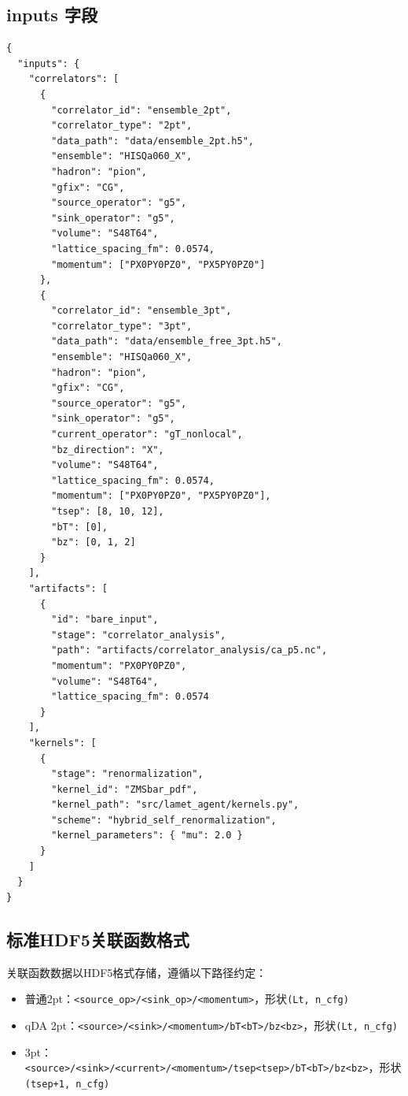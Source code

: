 \documentclass[12pt,a4paper]{ctexart}
\begin{document}
\subsection{inputs 字段}

\begin{lstlisting}[caption={inputs 结构示例}]
{
  "inputs": {
    "correlators": [
      {
        "correlator_id": "ensemble_2pt",
        "correlator_type": "2pt",
        "data_path": "data/ensemble_2pt.h5",
        "ensemble": "HISQa060_X",
        "hadron": "pion",
        "gfix": "CG",
        "source_operator": "g5",
        "sink_operator": "g5",
        "volume": "S48T64",
        "lattice_spacing_fm": 0.0574,
        "momentum": ["PX0PY0PZ0", "PX5PY0PZ0"]
      },
      {
        "correlator_id": "ensemble_3pt",
        "correlator_type": "3pt",
        "data_path": "data/ensemble_free_3pt.h5",
        "ensemble": "HISQa060_X",
        "hadron": "pion",
        "gfix": "CG",
        "source_operator": "g5",
        "sink_operator": "g5",
        "current_operator": "gT_nonlocal",
        "bz_direction": "X",
        "volume": "S48T64",
        "lattice_spacing_fm": 0.0574,
        "momentum": ["PX0PY0PZ0", "PX5PY0PZ0"],
        "tsep": [8, 10, 12],
        "bT": [0],
        "bz": [0, 1, 2]
      }
    ],
    "artifacts": [
      {
        "id": "bare_input",
        "stage": "correlator_analysis",
        "path": "artifacts/correlator_analysis/ca_p5.nc",
        "momentum": "PX0PY0PZ0",
        "volume": "S48T64",
        "lattice_spacing_fm": 0.0574
      }
    ],
    "kernels": [
      {
        "stage": "renormalization",
        "kernel_id": "ZMSbar_pdf",
        "kernel_path": "src/lamet_agent/kernels.py",
        "scheme": "hybrid_self_renormalization",
        "kernel_parameters": { "mu": 2.0 }
      }
    ]
  }
}
\end{lstlisting}

\subsection{标准HDF5关联函数格式}

关联函数数据以HDF5格式存储，遵循以下路径约定：

\begin{itemize}[leftmargin=*]
    \item 普通2pt：\texttt{<source\_op>/<sink\_op>/<momentum>}，形状\texttt{(Lt, n\_cfg)}
    \item qDA 2pt：\texttt{<source>/<sink>/<momentum>/bT<bT>/bz<bz>}，形状\texttt{(Lt, n\_cfg)}
    \item 3pt：\texttt{<source>/<sink>/<current>/<momentum>/tsep<tsep>/bT<bT>/bz<bz>}，形状\texttt{(tsep+1, n\_cfg)}
\end{itemize}
\end{document}
